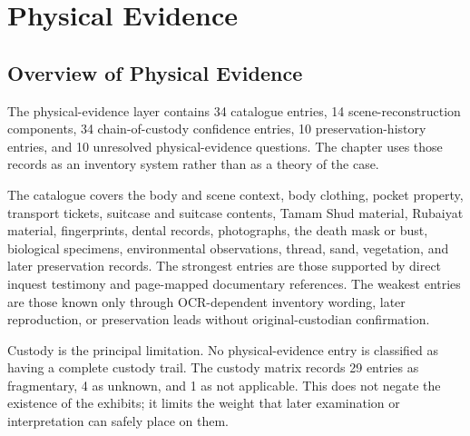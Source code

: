 \chapter{Physical Evidence}
\label{chap:physical-evidence}


\section{Overview of Physical Evidence}

The physical-evidence layer contains 34 catalogue entries, 14 scene-reconstruction components, 34 chain-of-custody confidence entries, 10 preservation-history entries, and 10 unresolved physical-evidence questions. The chapter uses those records as an inventory system rather than as a theory of the case.

The catalogue covers the body and scene context, body clothing, pocket property, transport tickets, suitcase and suitcase contents, Tamam Shud material, Rubaiyat material, fingerprints, dental records, photographs, the death mask or bust, biological specimens, environmental observations, thread, sand, vegetation, and later preservation records. The strongest entries are those supported by direct inquest testimony and page-mapped documentary references. The weakest entries are those known only through OCR-dependent inventory wording, later reproduction, or preservation leads without original-custodian confirmation.

Custody is the principal limitation. No physical-evidence entry is classified as having a complete custody trail. The custody matrix records 29 entries as fragmentary, 4 as unknown, and 1 as not applicable. This does not negate the existence of the exhibits; it limits the weight that later examination or interpretation can safely place on them.

